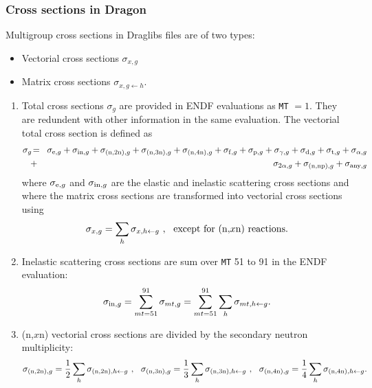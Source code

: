\vskip 0.2cm

\subsubsection{Cross sections in Dragon}\label{sect:xs}
Multigroup cross sections in Draglibs files are of two types:
\begin{itemize}
\item Vectorial cross sections $\sigma_{x,g}$
\item Matrix cross sections $\sigma_{x,g\leftarrow h}.$
\end{itemize}
\begin{enumerate}
\item Total cross sections $\sigma_g$ are provided in ENDF evaluations as {\tt MT} $=1$. They are redundent with other information in the same evaluation. The vectorial total cross section is defined as
\begin{eqnarray}
\nonumber \sigma_g\negthinspace &=&\negthinspace \sigma_{{\rm e},g}+\sigma_{{\rm in},g}+\sigma_{{\rm (n,2n)},g}+\sigma_{{\rm (n,3n)},g}+\sigma_{{\rm (n,4n)},g}+\sigma_{{\rm f},g}+\sigma_{{\rm p},g}+\sigma_{\gamma,g}
+\sigma_{{\rm d},g}+\sigma_{{\rm t},g}+\sigma_{\alpha,g}\\
&+&\negthinspace \sigma_{2\alpha,g}+\sigma_{{\rm (n,np)},g}+\sigma_{{\rm any},g}
\end{eqnarray}
\noindent where $\sigma_{{\rm e},g}$ and $\sigma_{{\rm in},g}$ are the elastic and inelastic scattering cross sections and where the matrix cross sections are transformed into vectorial cross sections using
\begin{equation}
\sigma_{x,g}=\sum_h \sigma_{x,h\leftarrow g} \ , \ \ {\rm except \ for \ (n,}x{\rm n) \ reactions.}
\end{equation}
\item Inelastic scattering cross sections are sum over {\tt MT} 51 to 91 in the ENDF evaluation:
\begin{equation}
\sigma_{{\rm in},g}=\sum_{{\sl mt}=51}^{91} \sigma_{{\sl mt},g}=\sum_{{\sl mt}=51}^{91} \sum_h \sigma_{{\sl mt},h\leftarrow g} .
\end{equation}
\item (n,$x$n) vectorial cross sections are divided by the secondary neutron multiplicity:
\begin{equation}
\sigma_{{\rm (n,2n)},g}={1\over 2}\sum_h \sigma_{{\rm (n,2n)},h\leftarrow g} \ , \ \ \sigma_{{\rm (n,3n)},g}={1\over 3}\sum_h \sigma_{{\rm (n,3n)},h\leftarrow g} \ , \ \ \sigma_{{\rm (n,4n)},g}={1\over 4}\sum_h \sigma_{{\rm (n,4n)},h\leftarrow g} .

\end{equation}
\end{enumerate}
